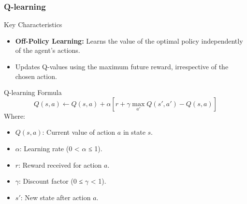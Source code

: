 \documentclass[aspectratio=169]{beamer}
\begin{document}
\begin{frame}[fragile]
    \frametitle{Q-learning}
    \begin{block}{Key Characteristics}
        \begin{itemize}
            \item \textbf{Off-Policy Learning:} Learns the value of the optimal policy independently of the agent's actions.
            \item Updates Q-values using the maximum future reward, irrespective of the chosen action.
        \end{itemize}
    \end{block}

    \begin{block}{Q-learning Formula}
        \begin{equation}
            Q(s, a) \leftarrow Q(s, a) + \alpha \left[ r + \gamma \max_{a'} Q(s', a') - Q(s, a) \right]
        \end{equation}
        Where:
        \begin{itemize}
            \item $Q(s, a)$: Current value of action $a$ in state $s$.
            \item $\alpha$: Learning rate (0 < $\alpha$ ≤ 1).
            \item $r$: Reward received for action $a$.
            \item $\gamma$: Discount factor (0 ≤ $\gamma$ < 1).
            \item $s'$: New state after action $a$.
        \end{itemize}
    \end{block}
\end{frame}
\end{document}
